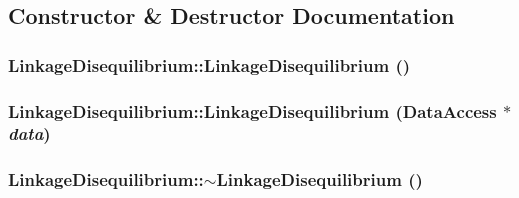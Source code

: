 \subsection{Constructor \& Destructor Documentation}
\hypertarget{classLinkageDisequilibrium_a2c865ee249f25e08594f44ca2fddedcc}{
\subsubsection[{LinkageDisequilibrium}]{\setlength{\rightskip}{0pt plus 5cm}LinkageDisequilibrium::LinkageDisequilibrium ()}}
\label{classLinkageDisequilibrium_a2c865ee249f25e08594f44ca2fddedcc}
\hypertarget{classLinkageDisequilibrium_a3cbd5550ac91f329d76fc7652a58edd5}{
\subsubsection[{LinkageDisequilibrium}]{\setlength{\rightskip}{0pt plus 5cm}LinkageDisequilibrium::LinkageDisequilibrium ({\bf DataAccess} $\ast$ {\em data})}}
\label{classLinkageDisequilibrium_a3cbd5550ac91f329d76fc7652a58edd5}
\hypertarget{classLinkageDisequilibrium_a8c0492fd94c5c4b966ba10cad283baf1}{
\subsubsection[{$\sim$LinkageDisequilibrium}]{\setlength{\rightskip}{0pt plus 5cm}LinkageDisequilibrium::$\sim$LinkageDisequilibrium ()}}
\label{classLinkageDisequilibrium_a8c0492fd94c5c4b966ba10cad283baf1}


